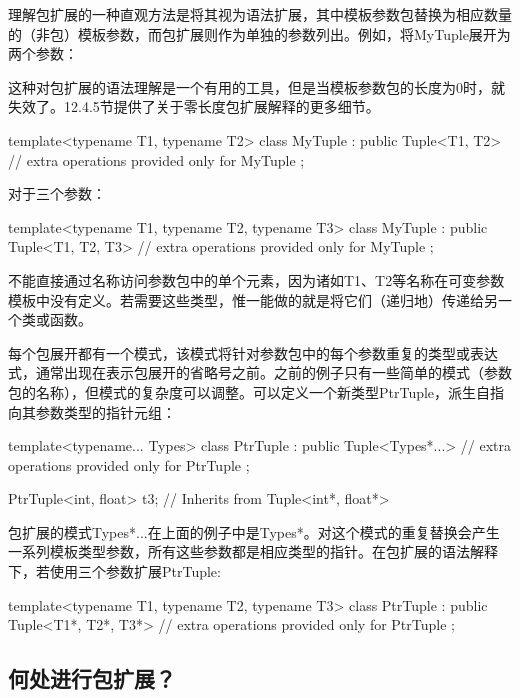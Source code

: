 理解包扩展的一种直观方法是将其视为语法扩展，其中模板参数包替换为相应数量的（非包）模板参数，而包扩展则作为单独的参数列出。例如，将MyTuple展开为两个参数：

\begin{notice}
这种对包扩展的语法理解是一个有用的工具，但是当模板参数包的长度为0时，就失效了。12.4.5节提供了关于零长度包扩展解释的更多细节。
\end{notice}

\begin{cpp}
template<typename T1, typename T2>
class MyTuple : public Tuple<T1, T2> {
	// extra operations provided only for MyTuple
};
\end{cpp}

对于三个参数：

\begin{cpp}
template<typename T1, typename T2, typename T3>
class MyTuple : public Tuple<T1, T2, T3> {
	// extra operations provided only for MyTuple
};
\end{cpp}

不能直接通过名称访问参数包中的单个元素，因为诸如T1、T2等名称在可变参数模板中没有定义。若需要这些类型，惟一能做的就是将它们（递归地）传递给另一个类或函数。

每个包展开都有一个模式，该模式将针对参数包中的每个参数重复的类型或表达式，通常出现在表示包展开的省略号之前。之前的例子只有一些简单的模式（参数包的名称），但模式的复杂度可以调整。可以定义一个新类型PtrTuple，派生自指向其参数类型的指针元组：

\begin{cpp}
template<typename... Types>
class PtrTuple : public Tuple<Types*...> {
	// extra operations provided only for PtrTuple
};

PtrTuple<int, float> t3; // Inherits from Tuple<int*, float*>
\end{cpp}

包扩展的模式Types*...在上面的例子中是Types*。对这个模式的重复替换会产生一系列模板类型参数，所有这些参数都是相应类型的指针。在包扩展的语法解释下，若使用三个参数扩展PtrTuple:

\begin{cpp}
template<typename T1, typename T2, typename T3>
class PtrTuple : public Tuple<T1*, T2*, T3*> {
	// extra operations provided only for PtrTuple
};
\end{cpp}

\subsection{何处进行包扩展？}

